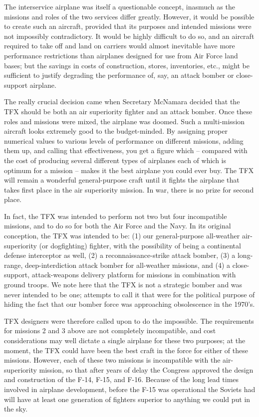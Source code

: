 The interservice airplane was itself a questionable concept, inasmuch as the missions and roles of the two services differ greatly. However, it would be possible to create such an aircraft, provided that its purposes and intended missions were not impossibly contradictory. It would be highly difficult to do so, and an aircraft required to take off and land on carriers would almost inevitable have more performance restrictions than airplanes designed for use from Air Force land bases; but the savings in costs of construction, stores, inventories, etc., might be sufficient to justify degrading the performance of, say, an attack bomber or close-support airplane.

The really crucial decision came when Secretary McNamara decided that the TFX should be both an air superiority fighter and an attack bomber. Once these roles and missions were mixed, the airplane was doomed. Such a multi-mission aircraft looks extremely good to the budget-minded. By assigning proper numerical values to various levels of performance on different missions, adding them up, and calling that effectiveness, you get a figure which -- compared with the cost of producing several different types of airplanes each of which is optimum for a mission -- makes it the best airplane you could ever buy. The TFX will remain a wonderful general-purpose craft until it fights the airplane that takes first place in the air superiority mission. In war, there is no prize for second place.

In fact, the TFX was intended to perform not two but four incompatible missions, and to do so for both the Air Force and the Navy. In its original conception, the TFX was intended to be: (1) our general-purpose all-weather air-superiority (or dogfighting) fighter, with the possibility of being a continental defense interceptor as well, (2) a reconnaissance-strike attack bomber, (3) a long-range, deep-interdiction attack bomber for all-weather missions, and (4) a close-support, attack-weapons delivery platform for missions in combination with ground troops. We note here that the TFX is not a strategic bomber and was never intended to be one; attempts to call it that were for the political purpose of hiding the fact that our bomber force was approaching obsolescence in the 1970's.

TFX designers were therefore called upon to do the impossible. The requirements for missions 2 and 3 above are not completely incompatible, and cost considerations may well dictate a single airplane for these two purposes; at the moment, the TFX could have been the best craft in the force for either of these missions. However, each of these two missions is incompatible with the air-superiority mission, so that after years of delay the Congress approved the design and construction of the F-14, F-15, and F-16. Because of the long lead times involved in airplane development, before the F-15 was operational the Soviets had will have at least one generation of fighters superior to anything we could put in the sky.


